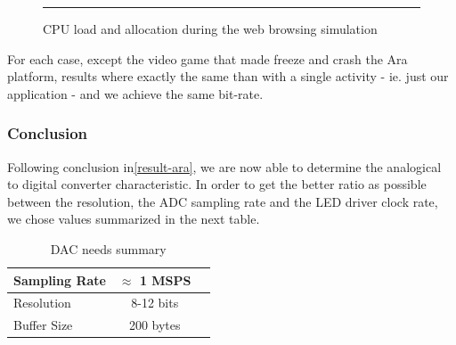 \begin{figure}[htbp]
    \label{fig:cpu-load}
    \rule{35em}{0.5pt}
    \caption[CPU load and repartitions during the web browsing simulation]{CPU load and allocation during the web browsing simulation}
\end{figure}

For each case, except the video game that made freeze and crash the Ara platform, results where exactly the same than with a single activity - ie. just our application - and we achieve the same bit-rate.

\subsubsection{Conclusion}
{
Following conclusion in\ref{result-ara}, we are now able to determine the analogical to digital converter characteristic. In order to get the better ratio as possible between the resolution, the ADC sampling rate and the LED driver clock rate, we chose values summarized in the next table.

\begin{table}[htbp]
\begin{center}
\begin{tabular}{|l|c|r|}
  \hline
  Sampling Rate & $\approx$ 1 MSPS \\
  \hline
  Resolution & 8-12 bits \\
  \hline
  Buffer Size & 200 bytes\\
  \hline
\end{tabular}
\end{center}
\caption{DAC needs summary}
\label{tab:conclusion-adc}
\end{table}
}


